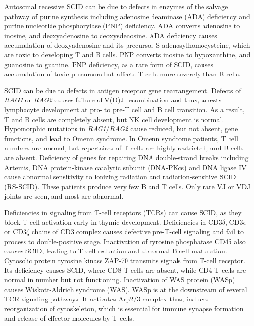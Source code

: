 \documentclass[11pt]{article}
\begin{document}
\begin{sloppypar}
\par

Autosomal recessive SCID can be due to defects in enzymes of the salvage pathway of purine synthesis including adenosine deaminase (ADA) deficiency and purine nucleotide phosphorylase (PNP) deficiency. 
ADA converts adenosine to inosine, and deoxyadenosine to deoxysdenosine. 
ADA deficiency causes accumulation of deoxyadenosine and its precursor S-adenosylhomocysteine, which are toxic to developing T and B cells. 
PNP converts inosine to hypoxanthine, and guanosine to guanine. 
PNP deficiency, as a rare form of SCID, causes accumulation of toxic precursors but affects T cells more severely than B cells.

\par

SCID can be due to defects in antigen receptor gene rearrangement. 
Defects of \textit{RAG1} or \textit{RAG2} causes failure of V(D)J recombination and thus, arrests lymphocyte development at pro- to pre-T cell and B cell transition. 
As a result, T and B cells are completely absent, but NK cell development is normal. 
Hypomorphic mutations in \textit{RAG1}/\textit{RAG2} cause reduced, but not absent, gene functions, and lead to Omenn syndrome. 
In Omenn syndrome patients, T cell numbers are normal, but repertoires of T cells are highly restricted, and B cells are absent. 
Deficiency of genes for repairing DNA double-strand breaks including Artemis, DNA protein-kinase catalytic subunit (DNA-PKcs) and DNA ligase IV cause abnormal sensitivity to ionizing radiation and radiation-sensitive SCID (RS-SCID). 
These patients produce very few B and T cells. 
Only rare VJ or VDJ joints are seen, and most are abnormal. 

\par

Deficiencies in signaling from T-cell receptors (TCRs) can cause SCID, as they block T cell activation early in thymic development. 
Deficiencies in CD3$\delta$, CD3$\epsilon$ or CD3$\zeta$ chains of CD3 complex causes defective pre-T-cell signaling and fail to process to double-positive stage. 
Inactivation of tyrosine phosphatase CD45 also causes SCID, leading to T cell reduction and abnormal B cell maturation. 
Cytosolic protein tyrosine kinase ZAP-70 transmits signals from T-cell receptor. 
Its deficiency causes SCID, where CD8 T cells are absent, while CD4 T cells are normal in number but not functioning. 
Inactivation of WAS protein (WASp) causes Wiskott-Aldrich syndrome (WAS). 
WASp is at the downstream of several TCR signaling pathways. 
It activates Arp2/3 complex thus, induces reorganization of cytoskeleton, which is essential for immune synapse formation and release of effector molecules by T cells. 


\end{sloppypar}
\end{document}
